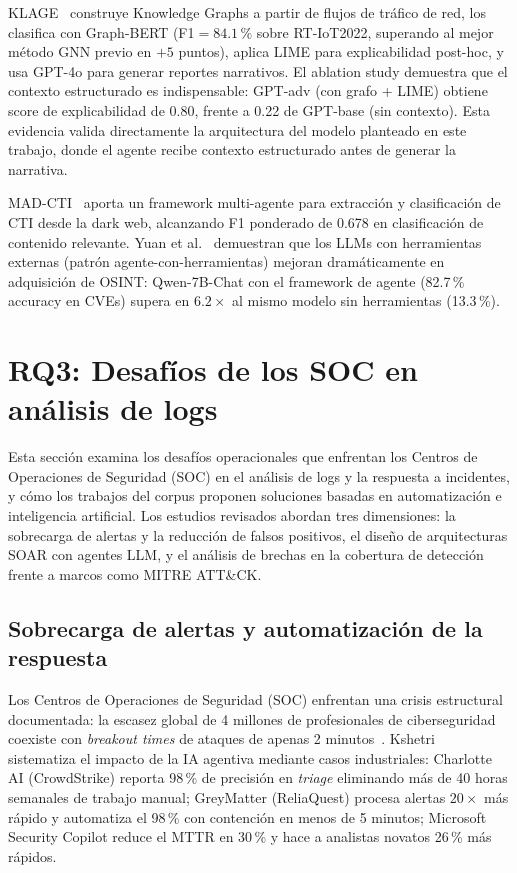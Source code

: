 KLAGE~\cite{belcastro2026klage} construye Knowledge Graphs a partir de
flujos de tráfico de red, los clasifica con Graph-BERT (F1$=84.1\,\%$
sobre RT-IoT2022, superando al mejor método GNN previo en $+5$ puntos),
aplica LIME para explicabilidad post-hoc, y usa GPT-4o para generar
reportes narrativos. El ablation study demuestra que el contexto
estructurado es indispensable: GPT-adv (con grafo + LIME) obtiene score
de explicabilidad de 0.80, frente a 0.22 de GPT-base (sin contexto).
Esta evidencia valida directamente la arquitectura del modelo planteado en este trabajo, donde
el agente recibe contexto estructurado antes de generar la narrativa.

MAD-CTI~\cite{shah2025madcti} aporta un framework multi-agente para
extracción y clasificación de CTI desde la dark web, alcanzando F1
ponderado de 0.678 en clasificación de contenido relevante. Yuan et
al.~\cite{yuan2024osint} demuestran que los LLMs con herramientas externas
(patrón agente-con-herramientas) mejoran dramáticamente en adquisición
de OSINT: Qwen-7B-Chat con el framework de agente (82.7\,\% accuracy en
CVEs) supera en $6.2\times$ al mismo modelo sin herramientas (13.3\,\%).

\section{RQ3: Desafíos de los SOC en análisis de logs}

Esta sección examina los desafíos operacionales que enfrentan los
Centros de Operaciones de Seguridad (SOC) en el análisis de logs y
la respuesta a incidentes, y cómo los trabajos del corpus proponen
soluciones basadas en automatización e inteligencia artificial. Los
estudios revisados abordan tres dimensiones: la sobrecarga de alertas
y la reducción de falsos positivos, el diseño de arquitecturas SOAR
con agentes LLM, y el análisis de brechas en la cobertura de detección
frente a marcos como MITRE ATT\&CK.

\subsection{Sobrecarga de alertas y automatización de la respuesta}

Los Centros de Operaciones de Seguridad (SOC) enfrentan una crisis
estructural documentada: la escasez global de 4 millones de profesionales
de ciberseguridad coexiste con \textit{breakout times} de ataques de apenas 2
minutos~\cite{kshetri2025agentic}. Kshetri~\cite{kshetri2025agentic}
sistematiza el impacto de la IA agentiva mediante casos industriales:
Charlotte AI (CrowdStrike) reporta 98\,\% de precisión en \textit{triage}
eliminando más de 40 horas semanales de trabajo manual; GreyMatter
(ReliaQuest) procesa alertas $20\times$ más rápido y automatiza el
98\,\% con contención en menos de 5 minutos; Microsoft Security Copilot
reduce el MTTR en 30\,\% y hace a analistas novatos 26\,\% más rápidos.

